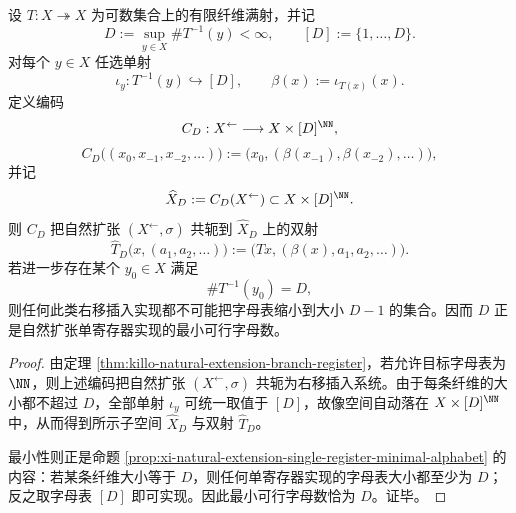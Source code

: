 \begin{theorem}[有界纤维满射的最小字母自然扩张实现]\label{thm:xi-natural-extension-minimal-d-alphabet-realization}
设 \(T:X\twoheadrightarrow X\) 为可数集合上的有限纤维满射，并记
\[
D:=\sup_{y\in X}\#T^{-1}(y)<\infty,
\qquad
[D]:=\{1,\dots,D\}.
\]
对每个 \(y\in X\) 任选单射
\[
\iota_y:T^{-1}(y)\hookrightarrow [D],
\qquad
\beta(x):=\iota_{T(x)}(x).
\]
定义编码
\[
C_D:X^{\leftarrow}\longrightarrow X\times [D]^{\NN},
\]
\[
C_D\bigl((x_0,x_{-1},x_{-2},\dots)\bigr)
:=
\bigl(x_0,(\beta(x_{-1}),\beta(x_{-2}),\dots)\bigr),
\]
并记
\[
\widehat X_D:=C_D(X^{\leftarrow})\subset X\times [D]^{\NN}.
\]
则 \(C_D\) 把自然扩张 \((X^{\leftarrow},\sigma)\) 共轭到 \(\widehat X_D\) 上的双射
\[
\widehat T_D\bigl(x,(a_1,a_2,\dots)\bigr)
:=
\bigl(Tx,(\beta(x),a_1,a_2,\dots)\bigr).
\]
若进一步存在某个 \(y_0\in X\) 满足
\[
\#T^{-1}(y_0)=D,
\]
则任何此类右移插入实现都不可能把字母表缩小到大小 \(D-1\) 的集合。因而 \(D\) 正是自然扩张单寄存器实现的最小可行字母数。
\end{theorem}
\begin{proof}
由定理 \ref{thm:killo-natural-extension-branch-register}，若允许目标字母表为 \(\NN\)，则上述编码把自然扩张 \((X^{\leftarrow},\sigma)\) 共轭为右移插入系统。由于每条纤维的大小都不超过 \(D\)，全部单射 \(\iota_y\) 可统一取值于 \([D]\)，故像空间自动落在 \(X\times [D]^{\NN}\) 中，从而得到所示子空间 \(\widehat X_D\) 与双射 \(\widehat T_D\)。

最小性则正是命题 \ref{prop:xi-natural-extension-single-register-minimal-alphabet} 的内容：若某条纤维大小等于 \(D\)，则任何单寄存器实现的字母表大小都至少为 \(D\)；反之取字母表 \([D]\) 即可实现。因此最小可行字母数恰为 \(D\)。证毕。
\end{proof}

\endinput
